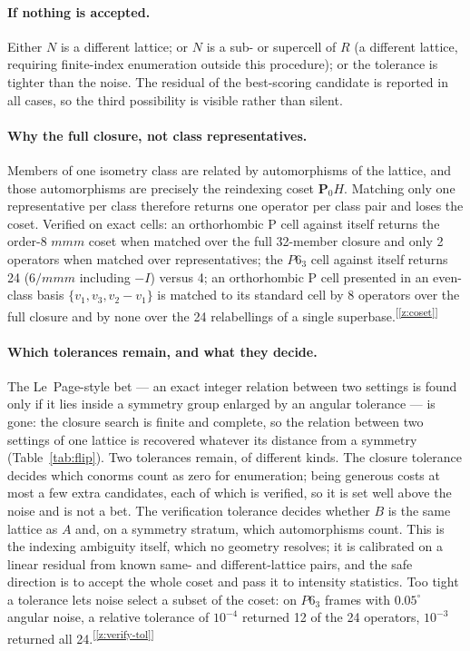 \documentclass[11pt]{article}
\newcommand{\Pop}{\mathbf{P}}
\newcommand{\chk}[1]{\textsuperscript{[\ref{#1}]}}
\begin{document}
\paragraph{If nothing is accepted.}
Either $N$ is a different lattice; or $N$ is a sub- or supercell of $R$ (a different lattice, requiring finite-index enumeration outside this procedure); or the tolerance is tighter than the noise. The residual of the best-scoring candidate is reported in all cases, so the third possibility is visible rather than silent.

\paragraph{Why the full closure, not class representatives.}
Members of one isometry class are related by automorphisms of the lattice, and those automorphisms are precisely the reindexing coset $\Pop_0H$. Matching only one representative per class therefore returns one operator per class pair and loses the coset. Verified on exact cells: an orthorhombic P cell against itself returns the order-8 $mmm$ coset when matched over the full 32-member closure and only 2 operators when matched over representatives; the $P6_3$ cell against itself returns 24 ($6/mmm$ including $-I$) versus 4; an orthorhombic P cell presented in an even-class basis $\{v_1,v_3,v_2-v_1\}$ is matched to its standard cell by 8 operators over the full closure and by none over the 24 relabellings of a single superbase.\chk{z:coset}

\paragraph{Which tolerances remain, and what they decide.}
The Le~Page-style bet --- an exact integer relation between two settings is found only if it lies inside a symmetry group enlarged by an angular tolerance --- is gone: the closure search is finite and complete, so the relation between two settings of one lattice is recovered whatever its distance from a symmetry (Table~\ref{tab:flip}). Two tolerances remain, of different kinds. The closure tolerance decides which conorms count as zero for enumeration; being generous costs at most a few extra candidates, each of which is verified, so it is set well above the noise and is not a bet. The verification tolerance decides whether $B$ is the same lattice as $A$ and, on a symmetry stratum, which automorphisms count. This is the indexing ambiguity itself, which no geometry resolves; it is calibrated on a linear residual from known same- and different-lattice pairs, and the safe direction is to accept the whole coset and pass it to intensity statistics. Too tight a tolerance lets noise select a subset of the coset: on $P6_3$ frames with $0.05^\circ$ angular noise, a relative tolerance of $10^{-4}$ returned 12 of the 24 operators, $10^{-3}$ returned all 24.\chk{z:verify-tol}
\end{document}
